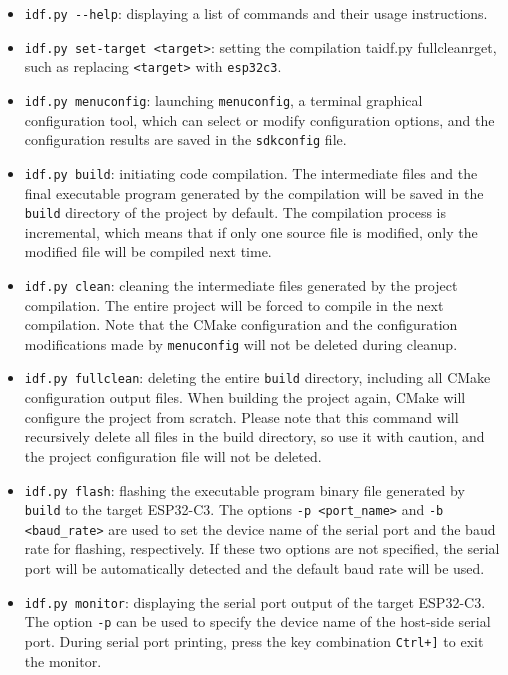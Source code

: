 \documentclass[a4paper,12pt]{book}
\begin{document}
\begin{itemize}[leftmargin=1.5em, noitemsep]
    \item \verb|idf.py --help|: displaying a list of commands and their usage instructions.
    \item \verb|idf.py set-target <target>|: setting the compilation taidf.py fullcleanrget, such as replacing \verb|<target>| with \verb|esp32c3|.
    \item \verb|idf.py menuconfig|: launching \verb|menuconfig|, a terminal graphical configuration tool, which can select or modify configuration options, and the configuration results are saved in the \verb|sdkconfig| file.
    \item \verb|idf.py build|: initiating code compilation. The intermediate files and the final executable program generated by the compilation will be saved in the \verb|build| directory of the project by default. The compilation process is incremental, which means that if only one source file is modified, only the modified file will be compiled next time.
    \item \verb|idf.py clean|: cleaning the intermediate files generated by the project compilation. The entire project will be forced to compile in the next compilation. Note that the CMake configuration and the configuration modifications made by \verb|menuconfig| will not be deleted during cleanup.
    \item \verb|idf.py fullclean|: deleting the entire \verb|build| directory, including all CMake configuration output files. When building the project again, CMake will configure the project from scratch. Please note that this command will recursively delete all files in the build directory, so use it with caution, and the project configuration file will not be deleted.
    \item \verb|idf.py flash|: flashing the executable program binary file generated by \verb|build| to the target ESP32-C3. The options \verb|-p <port_name>| and \verb|-b <baud_rate>| are used to set the device name of the serial port and the baud rate for flashing, respectively. If these two options are not specified, the serial port will be automatically detected and the default baud rate will be used.
    \item \verb|idf.py monitor|: displaying the serial port output of the target ESP32-C3. The option \verb|-p| can be used to specify the device name of the host-side serial port. During serial port printing, press the key combination \verb|Ctrl+]| to exit the monitor.
\end{itemize}
\end{document}
